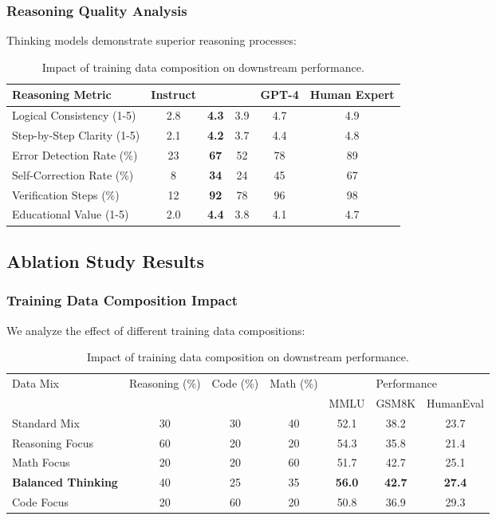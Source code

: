 \begin{table}[H]
\begin{table}[H]
\begin{table}[H]
\subsubsection{Reasoning Quality Analysis}

Thinking models demonstrate superior reasoning processes:

\begin{table}[H]
\centering
\begin{tabular}{lccccc}
\toprule
Reasoning Metric & Instruct & \supra{} & \zennano{} & GPT-4 & Human Expert \\
\midrule
Logical Consistency (1-5) & 2.8 & \textbf{4.3} & 3.9 & 4.7 & 4.9 \\
Step-by-Step Clarity (1-5) & 2.1 & \textbf{4.2} & 3.7 & 4.4 & 4.8 \\
Error Detection Rate (\%) & 23 & \textbf{67} & 52 & 78 & 89 \\
Self-Correction Rate (\%) & 8 & \textbf{34} & 24 & 45 & 67 \\
Verification Steps (\%) & 12 & \textbf{92} & 78 & 96 & 98 \\
Educational Value (1-5) & 2.0 & \textbf{4.4} & 3.8 & 4.1 & 4.7 \\
\bottomrule
\end{tabular}
\caption{Reasoning quality assessment by human evaluators (n=25 experts).}
\label{tab:reasoning-quality}
\end{table}

\subsection{Ablation Study Results}

\subsubsection{Training Data Composition Impact}

We analyze the effect of different training data compositions:

\begin{table}[H]
\centering
\begin{tabular}{lcccccc}
\toprule
\multirow{2}{*}{Data Mix} & \multirow{2}{*}{Reasoning (\%)} & \multirow{2}{*}{Code (\%)} & \multirow{2}{*}{Math (\%)} & \multicolumn{3}{c}{Performance} \\
\cmidrule(lr){5-7}
& & & & MMLU & GSM8K & HumanEval \\
\midrule
Standard Mix & 30 & 30 & 40 & 52.1 & 38.2 & 23.7 \\
Reasoning Focus & 60 & 20 & 20 & 54.3 & 35.8 & 21.4 \\
Math Focus & 20 & 20 & 60 & 51.7 & 42.7 & 25.1 \\
\textbf{Balanced Thinking} & 40 & 25 & 35 & \textbf{56.0} & \textbf{42.7} & \textbf{27.4} \\
Code Focus & 20 & 60 & 20 & 50.8 & 36.9 & 29.3 \\
\bottomrule
\end{tabular}
\caption{Impact of training data composition on downstream performance.}
\label{tab:data-composition}
\end{table}


\end{table}
\end{table}
\end{table}
